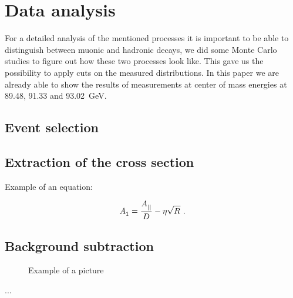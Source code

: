 \documentclass[epj,nopacs]{svjour}
\begin{document}
\section{ Data analysis}

For a detailed analysis of the mentioned processes it is important to be able
to distinguish between muonic and hadronic decays, we did some Monte Carlo
studies to figure out how these two processes look like. This gave us the
possibility to apply cuts on the measured distributions. In this paper we are
already able to show the results of measurements at center of mass energies at
89.48, 91.33 and \SI{93.02}{\giga\electronvolt}.

\subsection{ Event selection}

\subsection{Extraction of the cross section}

Example of an equation:

\begin{equation}
\label{a1vm}
A_{1}^{} = \frac{A^{}_{||}}{D^{}}  - \eta \sqrt{R^{}}\ . \\
\end{equation}


\subsection{Background subtraction}

\begin{figure}[ht]
\vspace*{-0.2cm}
\caption{\baselineskip=0.38cm Example of a picture}
\label{fig:1}   
\end{figure} 
...
\end{document}
